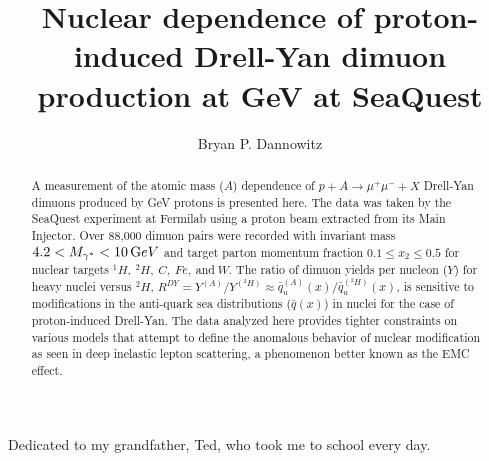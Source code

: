 \documentclass[edeposit,fullpage]{uiucthesis2009}
\begin{document}
\title{Nuclear dependence of proton-induced Drell-Yan dimuon production at \unit[120]{GeV} at SeaQuest}
\author{Bryan P. Dannowitz}
\phdthesis
{}
\maketitle

\frontmatter

\begin{abstract}
A measurement of the atomic mass ($A$) dependence of $p+A\rightarrow\mu^+\mu^- + X$ Drell-Yan dimuons produced by \unit[120]{GeV} protons is presented here. The data was taken by the SeaQuest experiment at Fermilab using a proton beam extracted from its Main Injector. Over 88,000 dimuon pairs were recorded with invariant mass $4.2 < M_{\gamma^*} < \unit[10] GeV$ and target parton momentum fraction $0.1\leq x_2 \leq 0.5$ for nuclear targets $^1H,\ ^2H,\ C,\ Fe,\ $and$\ W$. The ratio of dimuon yields per nucleon ($Y$) for heavy nuclei versus $^2H$, $R^{DY} = Y^{(A)} / Y^{(^2H)} \approx \bar{q}_u^{(A)}(x)/\bar{q}_u^{(^2H)}(x)$, is sensitive to modifications in the anti-quark sea distributions ($\bar{q}(x)$) in nuclei for the case of proton-induced Drell-Yan. The data analyzed here provides tighter constraints on various models that attempt to define the anomalous behavior of nuclear modification as seen in deep inelastic lepton scattering, a phenomenon better known as the EMC effect.

\end{abstract}


\begin{dedication}
Dedicated to my grandfather, Ted, who took me to school every day.
\end{dedication}

\end{document}
